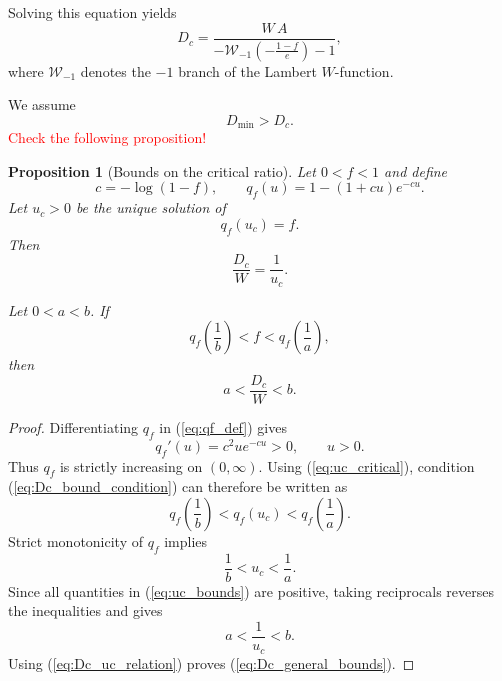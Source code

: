 \documentclass[10pt]{iopart}
\newcommand{\old}{\textcolor{red}}
\newcommand{\1}{\mathbf{1}}
\newtheorem{prop}{Proposition}[section]
\begin{document}
Solving this equation yields
\begin{equation}
D_c
=
\frac{
W\,A
}{
-\mathcal W_{-1}\!\left(-\frac{1-f}{e}\right)-1
},
\label{eq:Dc_formula}
\end{equation}
where $\mathcal W_{-1}$ denotes the $-1$ branch of the Lambert $W$-function.

We assume
\begin{equation}
D_{\min}>D_c.
\label{eq:contractive_assumption}
\end{equation}
\old{Check the following proposition!}
\begin{prop}[Bounds on the critical ratio]
\label{prop:Dc_bounds}
Let $0<f<1$ and define
\begin{equation}
c=-\log(1-f),
\qquad
q_f(u)=1-(1+cu)e^{-cu}.
\label{eq:qf_def}
\end{equation}
Let $u_c>0$ be the unique solution of
\begin{equation}
q_f(u_c)=f.
\label{eq:uc_critical}
\end{equation}
Then
\begin{equation}
\frac{D_c}{W}=\frac{1}{u_c}.
\label{eq:Dc_uc_relation}
\end{equation}

Let $0<a<b$. If
\begin{equation}
q_f\left(\frac{1}{b}\right)
<
f
<
q_f\left(\frac{1}{a}\right),
\label{eq:Dc_bound_condition}
\end{equation}
then
\begin{equation}
a
<
\frac{D_c}{W}
<
b.
\label{eq:Dc_general_bounds}
\end{equation}
\end{prop}

\begin{proof}
Differentiating $q_f$ in (\ref{eq:qf_def}) gives
\begin{equation}
q_f'(u)
=
c^2u e^{-cu}>0,
\qquad
u>0.
\label{eq:qf_monotonicity}
\end{equation}
Thus $q_f$ is strictly increasing on $(0,\infty)$. Using
(\ref{eq:uc_critical}), condition (\ref{eq:Dc_bound_condition}) can
therefore be written as
\begin{equation}
q_f\left(\frac{1}{b}\right)
<
q_f(u_c)
<
q_f\left(\frac{1}{a}\right).
\label{eq:Dc_bound_monotonicity}
\end{equation}
Strict monotonicity of $q_f$ implies
\begin{equation}
\frac{1}{b}
<
u_c
<
\frac{1}{a}.
\label{eq:uc_bounds}
\end{equation}
Since all quantities in (\ref{eq:uc_bounds}) are positive, taking
reciprocals reverses the inequalities and gives
\begin{equation}
a
<
\frac{1}{u_c}
<
b.
\label{eq:inverse_uc_bounds}
\end{equation}
Using (\ref{eq:Dc_uc_relation}) proves
(\ref{eq:Dc_general_bounds}).
\end{proof}
\end{document}
